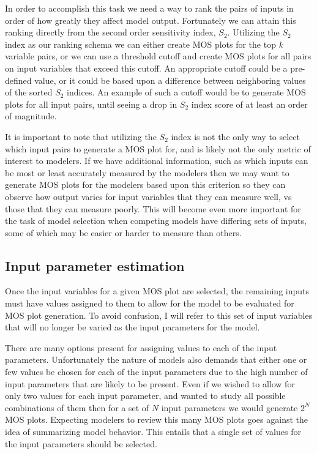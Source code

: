 In order to accomplish this task we need a way to rank the pairs of inputs in order of how greatly they affect model output. Fortunately we can attain this ranking directly from the second order sensitivity index, $S_2$. Utilizing the $S_2$ index as our ranking schema we can either create MOS plots for the top $k$ variable pairs, or we can use a threshold cutoff and create MOS plots for all pairs on input variables that exceed this cutoff. An appropriate cutoff could be a pre-defined value, or it could be based upon a difference between neighboring values of the sorted $S_2$ indices. An example of such a cutoff would be to generate MOS plots for all input pairs, until seeing a drop in $S_2$ index score of at least an order of magnitude.

It is important to note that utilizing the $S_2$ index is not the only way to select which input pairs to generate a MOS plot for, and is likely not the only metric of interest to modelers. If we have additional information, such as which inputs can be most or least accurately measured by the modelers then we may want to generate MOS plots for the modelers based upon this criterion so they can observe how output varies for input variables that they can measure well, vs those that they can measure poorly. This will become even more important for the task of model selection when competing models have differing sets of inputs, some of which may be easier or harder to measure than others.

\subsection{Input parameter estimation\label{sec:inp_param_est}}
Once the input variables for a given MOS plot are selected, the remaining inputs must have values assigned to them to allow for the model to be evaluated for MOS plot generation. To avoid confusion, I will refer to this set of input variables that will no longer be varied as the input parameters for the model.

There are many options present for assigning values to each of the input parameters. Unfortunately the nature of models also demands that either one or few values be chosen for each of the input parameters due to the high number of input parameters that are likely to be present. Even if we wished to allow for only two values for each input parameter, and wanted to study all possible combinations of them then for a set of $N$ input parameters we would generate $2^N$ MOS plots. Expecting modelers to review this many MOS plots goes against the idea of summarizing model behavior. This entails that a single set of values for the input parameters should be selected.

